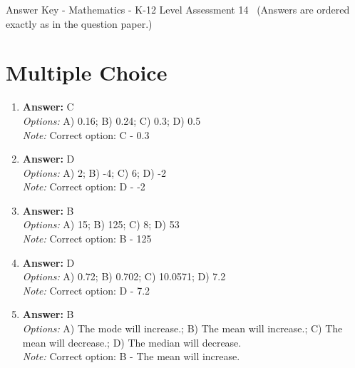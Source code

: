 \documentclass[12pt]{article}
\begin{document}
\begin{center}
Answer Key - Mathematics - K-12 Level Assessment 14 \
\small (Answers are ordered exactly as in the question paper.)
\end{center}

\section*{Multiple Choice}
\begin{enumerate}[label=\arabic*.]
\item \textbf{Answer:} C
\\ \textit{Options:} A) 0.16; B) 0.24; C) 0.3; D) 0.5
\\ \textit{Note:} Correct option: C - 0.3
\item \textbf{Answer:} D
\\ \textit{Options:} A) 2; B) -4; C) 6; D) -2
\\ \textit{Note:} Correct option: D - -2
\item \textbf{Answer:} B
\\ \textit{Options:} A) 15; B) 125; C) 8; D) 53
\\ \textit{Note:} Correct option: B - 125
\item \textbf{Answer:} D
\\ \textit{Options:} A) 0.72; B) 0.702; C) 10.0571; D) 7.2
\\ \textit{Note:} Correct option: D - 7.2
\item \textbf{Answer:} B
\\ \textit{Options:} A) The mode will increase.; B) The mean will increase.; C) The mean will decrease.; D) The median will decrease.
\\ \textit{Note:} Correct option: B - The mean will increase.
\end{enumerate}
\end{document}
